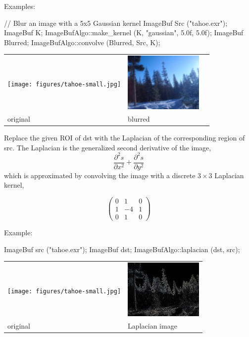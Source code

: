 \smallskip
\noindent Examples:
\begin{code}
    // Blur an image with a 5x5 Gaussian kernel
    ImageBuf Src ("tahoe.exr");
    ImageBuf K;
    ImageBufAlgo::make_kernel (K, "gaussian", 5.0f, 5.0f);
    ImageBuf Blurred;
    ImageBufAlgo::convolve (Blurred, Src, K);
\end{code}

\spc \begin{tabular}{lll}
\texttt{[image: figures/tahoe-small.jpg]} &
\includegraphics[width=1.5in]{figures/tahoe-blur.jpg} \\
original & blurred \\
\end{tabular}
\apiend

 
\NEW %
Replace the given ROI of {\cf dst} with the Laplacian of the corresponding
region of {\cf src}. The Laplacian is the generalized second derivative
of the image,
$$\frac{\partial^2 s}{\partial x^2} + \frac{\partial^2 s}{\partial y^2}$$
which is approximated by convolving the image with a discrete $3 \times 3$
Laplacian kernel,

\[ \left( \begin{array}{ccc}
0 &  1 & 0 \\
1 & -4 & 1 \\
0 &  1 & 0 \end{array} \right)\]

\smallskip
\noindent Example:
\begin{code}
    ImageBuf src ("tahoe.exr");
    ImageBuf dst;
    ImageBufAlgo::laplacian (dst, src);
\end{code}

\spc \begin{tabular}{ll}
\texttt{[image: figures/tahoe-small.jpg]} &
\includegraphics[width=1.5in]{figures/tahoe-laplacian.jpg} \\
original & Laplacian image \\
\end{tabular}

